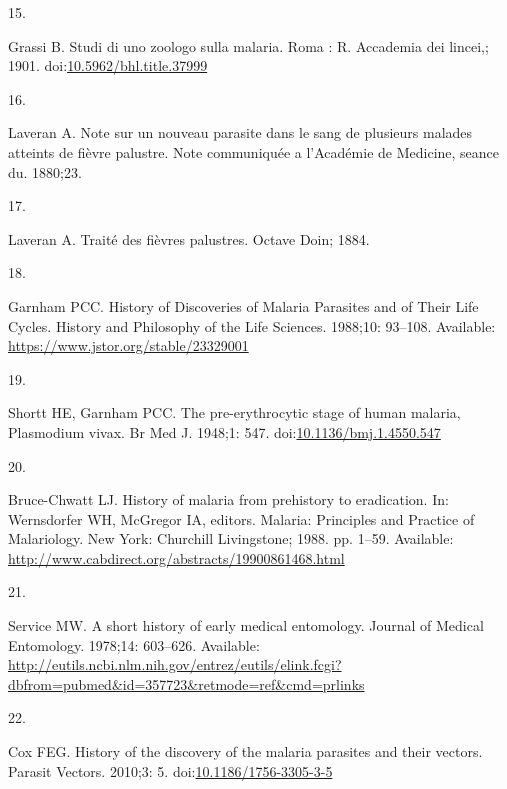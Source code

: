 \documentclass[
]{book}
\newlength{\cslhangindent}
\newlength{\csllabelwidth}
\newlength{\cslentryspacingunit} %
\newenvironment{CSLReferences}[2] %
 {%
  \setlength{\parindent}{0pt}
  \ifodd #1
  \let\oldpar\par
  \def\par{\hangindent=\cslhangindent\oldpar}
  \fi
  \setlength{\parskip}{#2\cslentryspacingunit}
 }%
 {}
\newcommand{\CSLLeftMargin}[1]{\parbox[t]{\csllabelwidth}{#1}}
\newcommand{\CSLRightInline}[1]{\parbox[t]{\linewidth - \csllabelwidth}{#1}\break}
\begin{document}
\begin{CSLReferences}{0}{0}
\leavevmode{}%
\CSLLeftMargin{15. }%
\CSLRightInline{Grassi B. Studi di uno zoologo sulla malaria. Roma : R. Accademia dei lincei,; 1901. doi:\href{https://doi.org/10.5962/bhl.title.37999}{10.5962/bhl.title.37999}}

\leavevmode{}%
\CSLLeftMargin{16. }%
\CSLRightInline{Laveran A. Note sur un nouveau parasite dans le sang de plusieurs malades atteints de fièvre palustre. Note communiquée a l'Académie de Medicine, seance du. 1880;23. }

\leavevmode{}%
\CSLLeftMargin{17. }%
\CSLRightInline{Laveran A. Traité des fièvres palustres. Octave Doin; 1884. }

\leavevmode{}%
\CSLLeftMargin{18. }%
\CSLRightInline{Garnham PCC. History of {Discoveries} of {Malaria} {Parasites} and of {Their} {Life} {Cycles}. History and Philosophy of the Life Sciences. 1988;10: 93--108. Available: \url{https://www.jstor.org/stable/23329001}}

\leavevmode{}%
\CSLLeftMargin{19. }%
\CSLRightInline{Shortt HE, Garnham PCC. The pre-erythrocytic stage of human malaria, {Plasmodium} vivax. Br Med J. 1948;1: 547. doi:\href{https://doi.org/10.1136/bmj.1.4550.547}{10.1136/bmj.1.4550.547}}

\leavevmode{}%
\CSLLeftMargin{20. }%
\CSLRightInline{Bruce-Chwatt LJ. History of malaria from prehistory to eradication. In: Wernsdorfer WH, McGregor IA, editors. Malaria: {Principles} and {Practice} of {Malariology}. New York: Churchill Livingstone; 1988. pp. 1--59. Available: \url{http://www.cabdirect.org/abstracts/19900861468.html}}

\leavevmode{}%
\CSLLeftMargin{21. }%
\CSLRightInline{Service MW. A short history of early medical entomology. Journal of Medical Entomology. 1978;14: 603--626. Available: \url{http://eutils.ncbi.nlm.nih.gov/entrez/eutils/elink.fcgi?dbfrom=pubmed\&id=357723\&retmode=ref\&cmd=prlinks}}

\leavevmode{}%
\CSLLeftMargin{22. }%
\CSLRightInline{Cox FEG. History of the discovery of the malaria parasites and their vectors. Parasit Vectors. 2010;3: 5. doi:\href{https://doi.org/10.1186/1756-3305-3-5}{10.1186/1756-3305-3-5}}


\end{CSLReferences}
\end{document}
